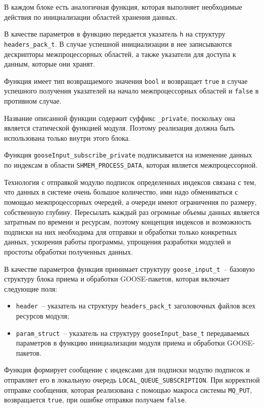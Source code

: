 В каждом блоке есть аналогичная функция, которая выполняет необходимые действия
по инициализации областей хранения данных.

В качестве параметров в функцию передается указатель \lstinline{h} на структуру
\lstinline{headers_pack_t}. В случае успешной инициализации в нее записываются
дескрипторы межпроцессорных областей, а также указатели
для доступа к данным, которые они хранят.

Функция имеет тип возвращаемого значения \lstinline{bool} и возвращает
\lstinline{true} в случае успешного получения указателей на начало межпроцессорных
областей и \lstinline{false} в противном случае.

Название описанной функции содержит суффикс \lstinline{_private},
поскольку она является статической функцией модуля. Поэтому реализация
должна быть использована только внутри этого блока.

Функция \lstinline{gooseInput_subscribe_private} подписывается на
изменение данных по индексам в области \lstinline{SHMEM_PROCESS_DATA},
которая является межпроцессорной.

Технология с отправкой модулю подписок определенных индексов связана с тем,
что данных в системе очень большое количество, ими надо обмениваться с помощью межпроцессорных очередей, а очереди имеют ограничения по размеру, собственную глубину.
Пересылать каждый раз огромные объемы данных является затратным по времени и
ресурсам, поэтому концепция индексов и возможность подписки на них необходима
для отправки и обработки только конкретных данных,
ускорения работы программы, упрощения разработки модулей и простоты обработки полученных данных.

В качестве параметров функция принимает структуру \lstinline{goose_input_t}~-- базовую структуру блока приема и обработки GOOSE-пакетов, которая включает следующие поля:

\begin{itemize}
    \item \lstinline{header}~-- указатель на структуру \lstinline{headers_pack_t} заголовочных файлов всех ресурсов модуля;
    \item \lstinline{param_struct}~-- указатель на структуру \lstinline{gooseInput_base_t} передаваемых параметров в функцию инициализации модуля приема и обработки GOOSE-пакетов.
\end{itemize}

Функция формирует сообщение с индексами для подписки модулю подписок и отправляет его в локальную очередь \lstinline{LOCAL_QUEUE_SUBSCRIPTION}. При корректной отправке сообщения, которая реализована с помощью макроса системы \lstinline{MQ_PUT}, возвращается \lstinline{true}, при ошибке отправки получаем \lstinline{false}.

